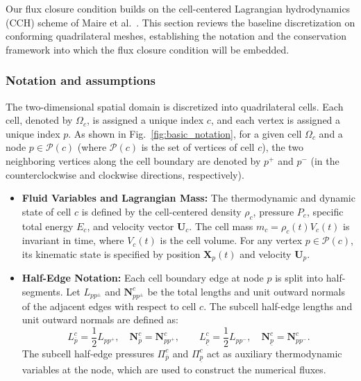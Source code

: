 \documentclass[a4paper]{cas-sc}
\begin{document}
Our flux closure condition builds on the cell-centered Lagrangian hydrodynamics (CCH) scheme of Maire et al.~\cite{maire2007SIAM}. This section reviews the baseline discretization on conforming quadrilateral meshes, establishing the notation and the conservation framework into which the flux closure condition will be embedded.

\subsubsection{Notation and assumptions}
\label{sec:notations}

The two-dimensional spatial domain is discretized into quadrilateral cells. Each cell, denoted by $\Omega_c$, is assigned a unique index $c$, and each vertex is assigned a unique index $p$. As shown in Fig.~\ref{fig:basic_notation}, for a given cell $\Omega_c$ and a node $p \in \mathcal{P}(c)$ (where $\mathcal{P}(c)$ is the set of vertices of cell $c$), the two neighboring vertices along the cell boundary are denoted by $p^+$ and $p^-$ (in the counterclockwise and clockwise directions, respectively).

\begin{itemize}
	\item \textbf{Fluid Variables and Lagrangian Mass:} The thermodynamic and dynamic state of cell $c$ is defined by the cell-centered density $\rho_c$, pressure $P_c$, specific total energy $E_c$, and velocity vector $\boldsymbol{U}_c$. The cell mass $m_c = \rho_c(t) V_c(t)$ is invariant in time, where $V_c(t)$ is the cell volume. For any vertex $p \in \mathcal{P}(c)$, its kinematic state is specified by position $\boldsymbol{X}_p(t)$ and velocity $\boldsymbol{U}_p$.
	
	\item \textbf{Half-Edge Notation:} Each cell boundary edge at node $p$ is split into half-segments. Let $L_{pp^{\pm}}$ and $\boldsymbol{N}_{pp^{\pm}}^c$ be the total lengths and unit outward normals of the adjacent edges with respect to cell $c$. The subcell half-edge lengths and unit outward normals are defined as:
	\begin{equation}
		L_{\overline{p}}^c = \frac{1}{2} L_{pp^+}, \quad \boldsymbol{N}_{\overline{p}}^c = \boldsymbol{N}_{pp^+}^c, \qquad
		L_{\underline{p}}^c = \frac{1}{2} L_{pp^-}, \quad \boldsymbol{N}_{\underline{p}}^c = \boldsymbol{N}_{pp^-}^c.
		\label{eq:halfedge_def}
	\end{equation}
	The subcell half-edge pressures $\Pi_{\overline{p}}^c$ and $\Pi_{\underline{p}}^c$ act as auxiliary thermodynamic variables at the node, which are used to construct the numerical fluxes.
\end{itemize}
\end{document}
